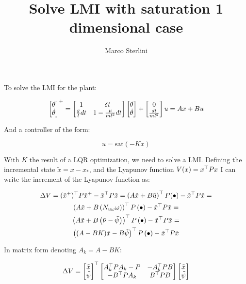 \documentclass{article}
\begin{document}
\date{}
\author{Marco Sterlini}

\title{Solve LMI with saturation 1 dimensional case}
\maketitle

To solve the LMI for the plant:

\begin{equation}
  \left[\begin{matrix}
  \theta \\
  \dot{\theta}
  \end{matrix}\right]^{+} = \left[\begin{matrix}
  1 & \delta t\\
  \frac{g}{l} dt & 1 - \frac{\mu}{m l^2} dt
  \end{matrix}\right] \left[\begin{matrix}
  \theta \\
  \dot{\theta}
  \end{matrix}\right] + \left[\begin{matrix}
    0 \\
    \frac{dt}{m l^2}
  \end{matrix}\right] u = A x + B u
\end{equation}

And a controller of the form:

\begin{equation}
  u = \text{sat}(-K x)
\end{equation}

With $K$ the result of a LQR optimization, we need to solve a LMI. Defining the incremental state $\tilde{x} = x - x_{*}$, and the Lyapunov function $V(x) = x ^\top P x$ I can write the increment of the Lyapunov function as:

\begin{multline}
\Delta V = (\tilde{x}^{+})^\top P \tilde{x}^{+} - \tilde{x}^\top P \tilde{x} = 
\left( A \tilde{x} + B \tilde{u} \right) ^\top P ( \bullet )- \tilde{x}^\top P \tilde{x} = \\
\left( A \tilde{x} + B \left( N_{u \omega} \omega \right)\right) ^\top P \left( \bullet \right) - \tilde{x}^\top P \tilde{x} = \\
\left( A \tilde{x} + B \left( \tilde{\nu} - \tilde{\psi} \right)\right) ^\top P \left( \bullet \right) - \tilde{x}^\top P \tilde{x} = \\
\left( (A - B K) \tilde{x} - B \tilde{\psi} \right) ^\top P \left( \bullet \right) - \tilde{x}^\top P \tilde{x} \\
\end{multline}

In matrix form denoting $A_{k} = A - B K$:

\begin{equation}
  \Delta V = \left[\begin{matrix}\tilde{x} \\ \tilde{\psi}\end{matrix}\right] ^\top \left[\begin{matrix}
    A_k^\top P A_k - P & -A_k^\top P B \\
    -B^\top P A_k & B^\top P B
  \end{matrix}\right] \left[\begin{matrix}\tilde{x} \\ \tilde{\psi}\end{matrix}\right]
\end{equation}
\end{document}
